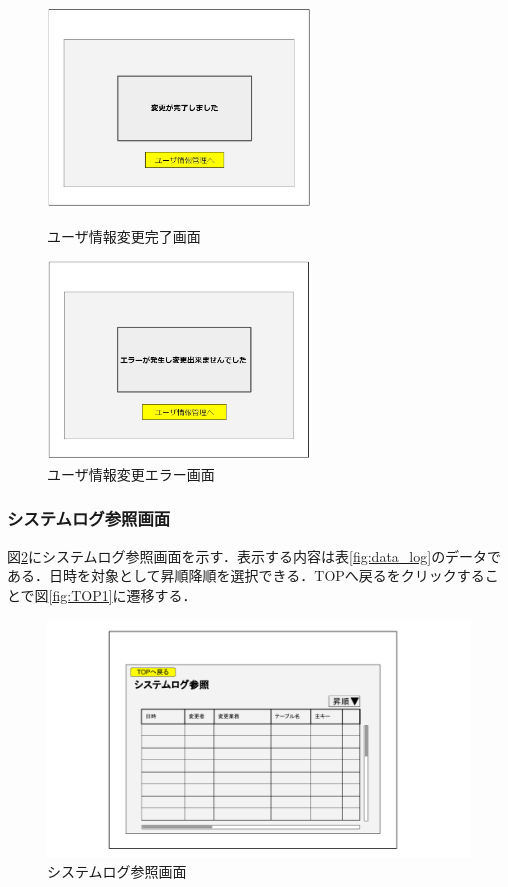 \documentclass[main]{subfiles}
\begin{document}
\begin{figure}[H]
    \begin{minipage}{0.5\hsize}
        \centering
        \includegraphics[width=7cm]{UI-umino/user6.JPG}
        \caption{ユーザ情報変更完了画面}
        \label{fig:user6}
    \end{minipage}
    \begin{minipage}{0.5\hsize}
        \centering
        \includegraphics[width=7cm]{UI-umino/user7.JPG}
        \caption{ユーザ情報変更エラー画面}
        \label{fig:user7}
    \end{minipage} 
\end{figure}

\subsubsection{システムログ参照画面}
図\ref{fig:log}にシステムログ参照画面を示す．表示する内容は表\ref{fig:data_log}のデータである．日時を対象として昇順降順を選択できる．TOPへ戻るをクリックすることで図\ref{fig:TOP1}に遷移する．

\begin{figure}[H]
 \centering
   \includegraphics[width=150mm]{UI-umino/system-log-preference.pdf}
 \caption{システムログ参照画面}
 \label{fig:log}
\end{figure}
\end{document}
